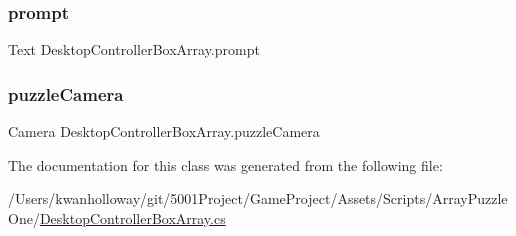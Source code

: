 \mbox{\label{class_desktop_controller_box_array_a947a69388f64d8e59d2836f0836a9538}} 
\subsubsection{\texorpdfstring{prompt}{prompt}}
{\footnotesize\ttfamily Text Desktop\+Controller\+Box\+Array.\+prompt}

\mbox{\label{class_desktop_controller_box_array_aceb8f6d6249766e34162daa8fb358b3a}} 
\subsubsection{\texorpdfstring{puzzle\+Camera}{puzzleCamera}}
{\footnotesize\ttfamily Camera Desktop\+Controller\+Box\+Array.\+puzzle\+Camera}



The documentation for this class was generated from the following file\+:\begin{DoxyCompactItemize}
\item 
/\+Users/kwanholloway/git/5001\+Project/\+Game\+Project/\+Assets/\+Scripts/\+Array\+Puzzle\+One/\hyperlink{_desktop_controller_box_array_8cs}{Desktop\+Controller\+Box\+Array.\+cs}\end{DoxyCompactItemize}
